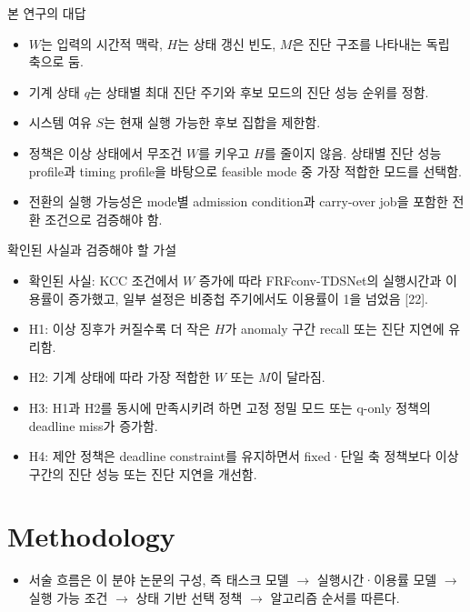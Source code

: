\documentclass[10pt]{article}
\begin{document}
\noindent 본 연구의 대답
\begin{itemize}
\item $W$는 입력의 시간적 맥락, $H$는 상태 갱신 빈도, $M$은 진단 구조를 나타내는 독립 축으로 둠.
\item 기계 상태 $q$는 상태별 최대 진단 주기와 후보 모드의 진단 성능 순위를 정함.
\item 시스템 여유 $S$는 현재 실행 가능한 후보 집합을 제한함.
\item 정책은 이상 상태에서 무조건 $W$를 키우고 $H$를 줄이지 않음. 상태별 진단 성능 profile과 timing profile을 바탕으로 feasible mode 중 가장 적합한 모드를 선택함.
\item 전환의 실행 가능성은 mode별 admission condition과 carry-over job을 포함한 전환 조건으로 검증해야 함.
\end{itemize}
\noindent 확인된 사실과 검증해야 할 가설
\begin{itemize}
\item 확인된 사실: KCC 조건에서 $W$ 증가에 따라 FRFconv-TDSNet의 실행시간과 이용률이 증가했고, 일부 설정은 비중첩 주기에서도 이용률이 1을 넘었음 [22].
\item H1: 이상 징후가 커질수록 더 작은 $H$가 anomaly 구간 recall 또는 진단 지연에 유리함.
\item H2: 기계 상태에 따라 가장 적합한 $W$ 또는 $M$이 달라짐.
\item H3: H1과 H2를 동시에 만족시키려 하면 고정 정밀 모드 또는 q-only 정책의 deadline miss가 증가함.
\item H4: 제안 정책은 deadline constraint를 유지하면서 fixed·단일 축 정책보다 이상 구간의 진단 성능 또는 진단 지연을 개선함.
\end{itemize}
\noindent{}

\section{Methodology}
\begin{itemize}
\item 서술 흐름은 이 분야 논문의 구성, 즉 태스크 모델 $\rightarrow$ 실행시간·이용률 모델 $\rightarrow$ 실행 가능 조건 $\rightarrow$ 상태 기반 선택 정책 $\rightarrow$ 알고리즘 순서를 따른다.
\end{itemize}
\end{document}
